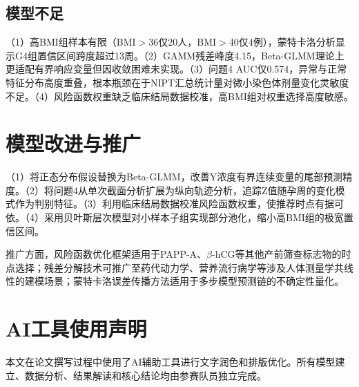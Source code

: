 \documentclass[withoutpreface]{cumcmthesis}
\begin{document}
\subsection{模型不足}

（1）高BMI组样本有限（BMI$>$36仅20人，BMI$>$40仅4例），蒙特卡洛分析显示G4组置信区间跨度超过13周。（2）GAMM残差峰度4.15，Beta-GLMM理论上更适配有界响应变量但因收敛困难未实现。（3）问题4 AUC仅0.574，异常与正常特征分布高度重叠，根本瓶颈在于NIPT汇总统计量对微小染色体剂量变化灵敏度不足。（4）风险函数权重缺乏临床结局数据校准，高BMI组对权重选择高度敏感。

\section{模型改进与推广}

（1）将正态分布假设替换为Beta-GLMM，改善Y浓度有界连续变量的尾部预测精度。（2）将问题4从单次截面分析扩展为纵向轨迹分析，追踪Z值随孕周的变化模式作为判别特征。（3）利用临床结局数据校准风险函数权重，使推荐时点有据可依。（4）采用贝叶斯层次模型对小样本子组实现部分池化，缩小高BMI组的极宽置信区间。

推广方面，风险函数优化框架适用于PAPP-A、$\beta$-hCG等其他产前筛查标志物的时点选择；残差分解技术可推广至药代动力学、营养流行病学等涉及人体测量学共线性的建模场景；蒙特卡洛误差传播方法适用于多步模型预测链的不确定性量化。

\section{AI工具使用声明}

本文在论文撰写过程中使用了AI辅助工具进行文字润色和排版优化。所有模型建立、数据分析、结果解读和核心结论均由参赛队员独立完成。

\newpage
\end{document}
